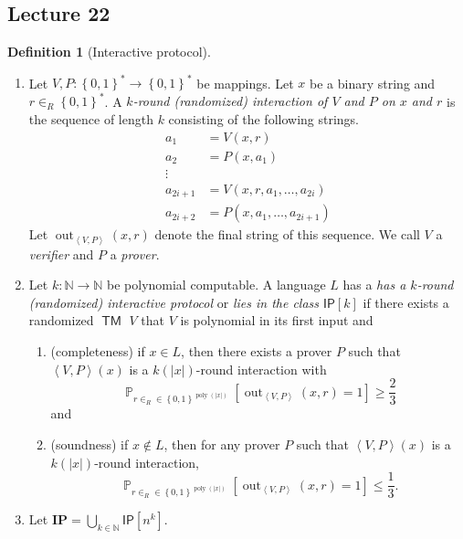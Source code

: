 \documentclass[10pt,letterpaper,cm]{nupset}
\theoremstyle{definition}
\newtheorem{definition}{Definition}[subsection]
\theoremstyle{theorem}
\theoremstyle{remark}
\newcommand{\N}{\mathbb N}
\newcommand{\1}{\mathbf{1}}
\newcommand{\0}{\vec 0}
\DeclareMathOperator{\out}{out}
\DeclareMathOperator{\pr}{\mathbb{P}}
\DeclareMathOperator{\TM}{\mathsf{TM}}
\DeclareMathOperator{\poly}{poly}
\begin{document}
\subsection{Lecture 22}

\begin{definition}[Interactive protocol] $ $
\begin{enumerate}
\item  Let $V, P: \left\{0,1\right\}^{\ast} \to \left\{0,1\right\}^{\ast}$ be mappings. Let $x$ be a binary string and $r\in_R \left\{0,1\right\}^{\ast}$. A \textit{$k$-round (randomized) interaction of $V$ and $P$ on $x$ and $r$} is the sequence of length $k$  consisting of the following strings.
\[
\begin{aligned} a_{1} &=V(x, r) \\ a_{2} &=P\left(x, a_{1}\right) \\ \vdots & \\ a_{2 i+1} &=V\left(x,r, a_{1}, \ldots, a_{2 i}\right) \\ a_{2 i+2} &=P\left(x, a_{1}, \ldots, a_{2 i+1}\right) \end{aligned}
\] Let $\out_{\left\langle V, P\right\rangle}(x, r)$ denote the final string of this sequence. We call $V$ a \textit{verifier} and $P$ a \textit{prover}.
\item Let $k : \N \to \N$ be polynomial computable. A language $L$ has a \textit{has a $k$-round (randomized) interactive protocol} or \textit{lies in the class $\mathsf{IP}[k]$} if there exists a randomized $\TM$ $V$ that $V$ is polynomial in its first input and
\begin{enumerate}
\item (completeness) if $x\in L$, then there exists a prover $P$ such that $\left\langle V, P\right\rangle(x)$ is a $k(\left\lvert{x}\right\rvert)$-round interaction with $$\pr_{r\in_R \in \left\{0,1\right\}^{\poly(\left\lvert{x}\right\rvert)}}\left[\out_{\left\langle V, P\right\rangle}(x, r) =1\right] \geq \frac{2}{3}$$ and 
\item (soundness) if $x\notin L$, then for any prover $P$ such that $\left\langle V, P\right\rangle(x)$ is a $k(\left\lvert{x}\right\rvert)$-round interaction, $$\pr_{r\in_R \in \left\{0,1\right\}^{\poly(\left\lvert{x}\right\rvert)}}\left[\out_{\left\langle V, P\right\rangle}(x, r) =1\right] \leq \frac{1}{3}.$$
\end{enumerate}
\item Let $\mathbf{IP} = \bigcup_{k\in \N}\mathsf{IP}\left[n^k\right]$.
\end{enumerate}
\end{definition}
\end{document}
